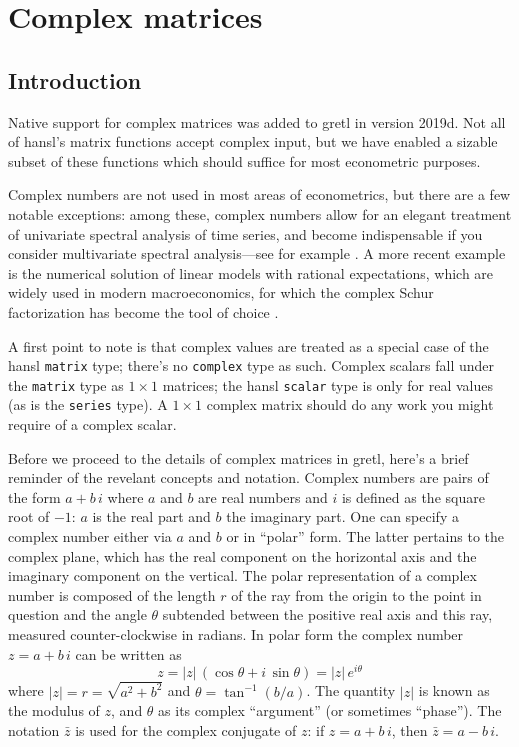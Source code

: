 \chapter{Complex matrices}
\label{chap:complex}

\section{Introduction}
\label{sec:cmplx-intro}

Native support for complex matrices was added to gretl in version
2019d. Not all of hansl's matrix functions accept complex input, but
we have enabled a sizable subset of these functions which should
suffice for most econometric purposes.

Complex numbers are not used in most areas of econometrics, but there
are a few notable exceptions: among these, complex numbers allow for
an elegant treatment of univariate spectral analysis of time series,
and become indispensable if you consider multivariate spectral
analysis---see for example \cite{shumwaystoffer2017}. A more recent
example is the numerical solution of linear models with rational
expectations, which are widely used in modern macroeconomics, for
which the complex Schur factorization has become the tool of choice
\citep{klein2000}.

A first point to note is that complex values are treated as a special
case of the hansl \texttt{matrix} type; there's no \texttt{complex}
type as such. Complex scalars fall under the \texttt{matrix} type as
$1 \times 1$ matrices; the hansl \texttt{scalar} type is only for real
values (as is the \texttt{series} type). A $1 \times 1$ complex matrix
should do any work you might require of a complex scalar.

Before we proceed to the details of complex matrices in gretl, here's
a brief reminder of the revelant concepts and notation. Complex
numbers are pairs of the form $a + b\,i$ where $a$ and $b$ are real
numbers and $i$ is defined as the square root of $-1$: $a$ is the real
part and $b$ the imaginary part. One can specify a complex number
either via $a$ and $b$ or in ``polar'' form. The latter pertains to
the complex plane, which has the real component on the horizontal axis
and the imaginary component on the vertical. The polar representation
of a complex number is composed of the length $r$ of the ray from the
origin to the point in question and the angle $\theta$ subtended
between the positive real axis and this ray, measured
counter-clockwise in radians. In polar form the complex number
$z = a + b\,i$ can be written as
\[
  z = |z|\,(\cos \theta + i\,\sin \theta) = |z|\,e^{i\theta}
\]
where $|z| = r = \sqrt{a^2 + b^2}$ and $\theta = \tan^{-1}(b/a)$. The
quantity $|z|$ is known as the modulus of $z$, and $\theta$ as its
complex ``argument'' (or sometimes ``phase''). The notation $\bar{z}$
is used for the complex conjugate of $z$: if $z = a + b\,i$, then
$\bar{z} = a - b\,i$.



